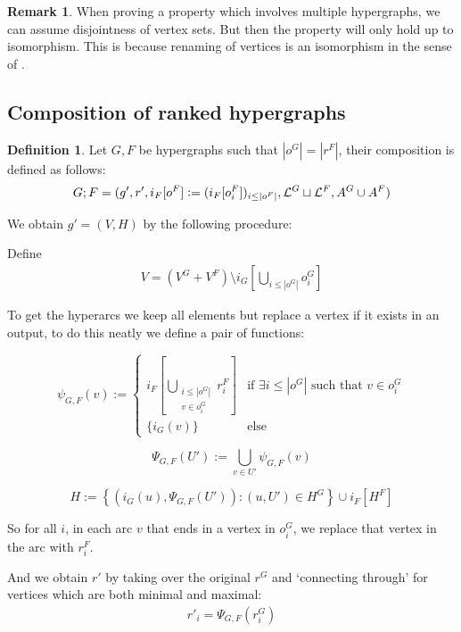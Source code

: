 \documentclass[12pt]{article}
\theoremstyle{definition}
\newtheorem{definition}[theorem]{Definition}
\newtheorem{remark}[theorem]{Remark}
\newcommand{\defeq}{\vcentcolon=}
\newcommand{\1}{\mathbbm{1}}
\renewcommand{\L}{\mathcal{L}}
\newcommand{\seq}{;}
\begin{document}
\begin{remark}
    When proving a property which involves multiple hypergraphs, we can assume disjointness of vertex sets. But then the property will only hold up to isomorphism. This is because renaming of vertices is an isomorphism in the sense of .
\end{remark}

\subsection{Composition of ranked hypergraphs}
\begin{definition}
Let $G, F$ be hypergraphs such that $|o^G| = |r^F|$, their composition is defined as follows:
\begin{align}
    G\seq F = (g', r', i_F[o^F] \defeq (i_F[o_i^F])_{i\leq |o^F|}, \L^G\sqcup \L^F, A^G\cup A^F)
\end{align}

We obtain $g' = (V,H)$ by the following procedure:

Define 
\begin{align*}
    V = (V^G + V^F) \setminus i_G[\bigcup_{i\leq |o^G|}o^G_i]
\end{align*}

To get the hyperarcs we keep all elements but replace a vertex if it exists in an output, to do this neatly we define a pair of functions:

\[
\psi_{G,F}(v) := 
\begin{cases}
    i_F[\displaystyle\bigcup_{\substack{i\leq |o^G| \\ v \in o^G_i}} r^F_i] & \text{if } \exists i \leq |o^G| \text{ such that } v \in o^G_i \\
    \{i_G(v)\} & \text{else}
\end{cases}
\]

\[
\Psi_{G, F}(U') := \bigcup_{v \in U'} \psi_{G, F}(v)
\]

\[
H := \left\{ \left(i_G(u), \Psi_{G, F}(U')\right) : (u, U') \in H^G \right\} \cup i_F[H^F]
\]

So for all $i$, in each arc $v$ that ends in a vertex in $o_i^G$, we replace that vertex in the arc with $r_i^F$. 

And we obtain $r'$ by taking over the original $r^G$ and `connecting through' for vertices which are both minimal and maximal:
\begin{align*}
    r'_i = \Psi_{G, F}(r^G_i)
\end{align*}
\end{definition}
\end{document}

